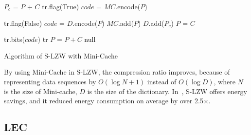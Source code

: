 \begin{algorithm}
\begin{algorithmic}[1]
\Input
\EndInput
\Output
\EndOutput

\State $P_c$ = $P$ + $C$
        \State tr.flag(True)    
        \State $code$ = $MC$.encode($P$)    
        
    \Else   {}
        \State tr.flag(False)
        \State $code$ = $D$.encode($P$)
        \State $MC$.add($P$)    
    \EndIf
    \State $D$.add($P_c$)
    \State $P$ = $C$
    
    \State tr.bits($code$)
    \State \Return tr
\Else       {}
    \State $P$ = $P+C$
    \State \Return null 
\EndIf

\end{algorithmic}
\caption{Algorithm of S-LZW with Mini-Cache}
\label{algo:S-LZW}
\end{algorithm}

By using Mini-Cache in S-LZW, the compression ratio improves, because of
representing data sequences by $O(\log N + 1)$ instead of $O(\log D)$,
where $N$ is the size of Mini-cache, $D$ is the size of the dictionary.
In~\cite{sadler2006data}, S-LZW offers energy savings, and it reduced
energy consumption on average by over 2.5$\times$.


\subsection{LEC}


